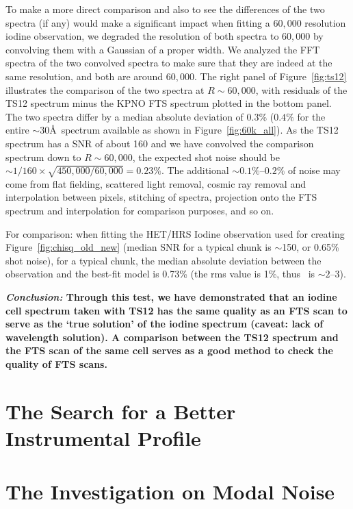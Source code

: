 To make a more direct comparison and also to see the differences of
the two spectra (if any) would make a significant impact when fitting
a $60,000$ resolution iodine observation, we degraded the resolution
of both spectra to $60,000$ by convolving them with a Gaussian of a
proper width. We analyzed the FFT spectra of the two convolved spectra
to make sure that they are indeed at the same resolution, and both are
around $60,000$. The right panel of Figure~\ref{fig:ts12} illustrates
the comparison of the two spectra at $R\sim60,000$, with residuals of
the TS12 spectrum minus the KPNO FTS spectrum plotted in the bottom
panel. The two spectra differ by a median absolute deviation of 0.3\%
($0.4\%$ for the entire $\sim$30\AA\ spectrum available as shown in
Figure~\ref{fig:60k_all}). As the TS12 spectrum has a SNR of about 160
and we have convolved the comparison spectrum down to $R\sim60,000$,
the expected shot noise should be $\sim 1/160\times
\sqrt{450,000/60,000}=0.23\%$. The additional $\sim 0.1\%$--$0.2\%$ of
noise may come from flat fielding, scattered light removal, cosmic ray
removal and interpolation between pixels, stitching of spectra,
projection onto the FTS spectrum and interpolation for comparison
purposes, and so on.

For comparison: when fitting the HET/HRS Iodine observation used for
creating Figure~\ref{fig:chisq_old_new} (median SNR for a typical
chunk is $\sim$150, or 0.65\% shot noise), for a typical chunk, the
median absolute deviation between the observation and the best-fit
model is 0.73\% (the rms value is 1\%, thus \chisq\ is $\sim 2$--$3$).


\textbf{\textit{Conclusion:} Through this test, we have demonstrated that an
  iodine cell spectrum taken with TS12 has the same quality as an FTS
  scan to serve as the `true solution' of the iodine spectrum (caveat:
  lack of wavelength solution). A comparison between the TS12 spectrum
  and the FTS scan of the same cell serves as a good method to check
  the quality of FTS scans.}




\section{The Search for a Better Instrumental Profile}


\section{The Investigation on Modal Noise}
  
